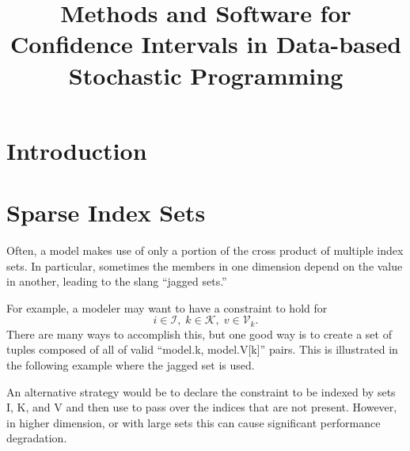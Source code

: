 \documentclass[9pt,usenames,dvipsnames]{beamer}
\title{Methods and Software for Confidence Intervals in Data-based Stochastic Programming}
\date{}
\author{}
\institute{\inst{1} Graduate School of Management, \\ University of California, Davis}
\date{}
\begin{document}
\maketitle

\section{Introduction}

\section{Sparse Index Sets \label{sec:sparseindex}}
\label{sec:performance.sparse_sets}

Often, a model makes use of only a portion of the cross product
of multiple index sets. In particular, sometimes the
members in one dimension depend on the value in another, leading
to the slang ``jagged sets.''

For example, a modeler may want to have a constraint to hold for
$$
i \in \mathcal{I},\; k \in \mathcal{K}, \; v \in \mathcal{V}_{k}.
$$
There are many ways to accomplish this, but one good way is to create a
set of tuples composed of all of valid ``model.k, model.V[k]'' pairs.
This is illustrated in the following example where the jagged
set  is used.


An alternative strategy would be to declare the constraint to be indexed by sets
I, K, and V and then use  to pass over the indices
that are not present. However, in higher dimension, or with large sets this can
cause significant performance degradation.
\end{document}

